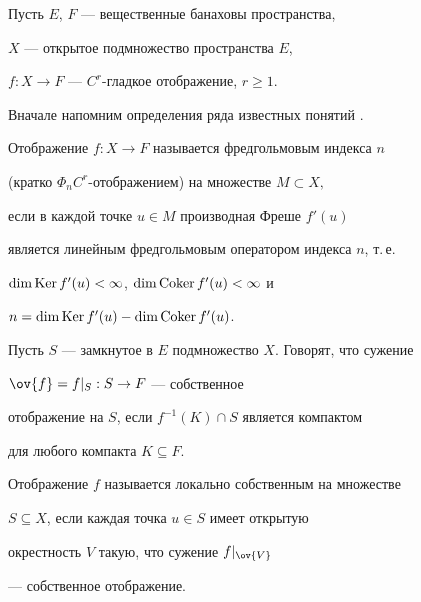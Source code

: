 Пусть $E$, $F$ --- вещественные банаховы пространства,


$X$ --- открытое подмножество пространства $E$,


$f:X \to F$ --- $C^r$-гладкое отображение, $r\geq 1$.





Вначале напомним определения ряда известных понятий \cite{3}.





\begin{defns}


Отображение $f:X \to F$ называется фредгольмовым индекса $n$


(кратко $\Phi_n C^r$-отображением) на множестве $M \subset X,$


если в каждой точке $u \in M$ производная Фреше $f' (u)$


является линейным фредгольмовым оператором индекса $n$, т.\,е.


$\dim \operatorname{Ker} f' (u) < \infty$, $\dim \operatorname{Coker} f' (u) < \infty$ и 


$n = \dim \operatorname{Ker} f' (u) - \dim \operatorname{Coker} f' (u)$.


\end{defns}





\begin{defns}


Пусть $S$ --- замкнутое в $E$ подмножество $X$. Говорят, что сужение


$\ov {f} = f|_S: S \to F$ --- собственное


отображение на $S$, если $f^{-1}(K) \cap S$ является компактом


для любого компакта $K \subseteq F$.


\end{defns}





\begin{defns}


Отображение $f$ называется локально собственным на множестве 


$S \subseteq X$, если каждая точка $u \in S$ имеет открытую


окрестность $V$ такую, что сужение $f|_{\ov {V}}$ 


--- собственное отображение.


\end{defns}





